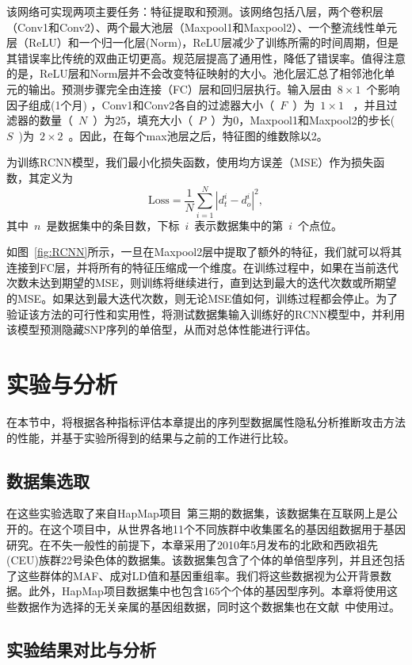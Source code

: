 该网络可实现两项主要任务：特征提取和预测。该网络包括八层，两个卷积层（Conv1和Conv2）、两个最大池层（Maxpool1和Maxpool2）、一个整流线性单元层（ReLU）和一个归一化层(Norm)，ReLU层减少了训练所需的时间周期，但是其错误率比传统的双曲正切更高。规范层提高了通用性，降低了错误率。值得注意的是，ReLU层和Norm层并不会改变特征映射的大小。池化层汇总了相邻池化单元的输出。预测步骤完全由连接（FC）层和回归层执行。输入层由~$8\times 1$~个影响因子组成(1个月) ，Conv1和Conv2各自的过滤器大小（~$F$~）为~$1\times 1$~ ，并且过滤器的数量（~$N$~）为25，填充大小（~$P$~）为0，Maxpool1和Maxpool2的步长(~$S$~)为~$2\times 2$~。因此，在每个max池层之后，特征图的维数除以2。


为训练RCNN模型，我们最小化损失函数，使用均方误差（MSE）作为损失函数，其定义为
\begin{equation}
\text{Loss}=\frac{1}{N}\sum_{i=1}^{N}|d_{t}^{i}-d_{o}^{i}|^{2},
\end{equation}
其中~$n$~是数据集中的条目数，下标~$i$~表示数据集中的第~$i$~个点位。


如图~\ref{fig:RCNN}所示，一旦在Maxpool2层中提取了额外的特征，我们就可以将其连接到FC层，并将所有的特征压缩成一个维度。在训练过程中，如果在当前迭代次数未达到期望的MSE，则训练将继续进行，直到达到最大的迭代次数或所期望的MSE。如果达到最大迭代次数，则无论MSE值如何，训练过程都会停止。为了验证该方法的可行性和实用性，将测试数据集输入训练好的RCNN模型中，并利用该模型预测隐藏SNP序列的单倍型，从而对总体性能进行评估。


\section{实验与分析}\label{sec:resul}
在本节中，将根据各种指标评估本章提出的序列型数据属性隐私分析推断攻击方法的性能，并基于实验所得到的结果与之前的工作进行比较。

\subsection{数据集选取}
在这些实验选取了来自HapMap项目~\cite{thorisson2005international}第三期的数据集，该数据集在互联网上是公开的。在这个项目中，从世界各地11个不同族群中收集匿名的基因组数据用于基因研究。在不失一般性的前提下，本章采用了2010年5月发布的北欧和西欧祖先(CEU)族群22号染色体的数据集。该数据集包含了个体的单倍型序列，并且还包括了这些群体的MAF、成对LD值和基因重组率。我们将这些数据视为公开背景数据。此外，HapMap项目数据集中也包含165个个体的基因型序列。本章将使用这些数据作为选择的无关亲属的基因组数据，同时这个数据集也在文献~\cite{samani2015quantifying}中使用过。
\subsection{实验结果对比与分析}

